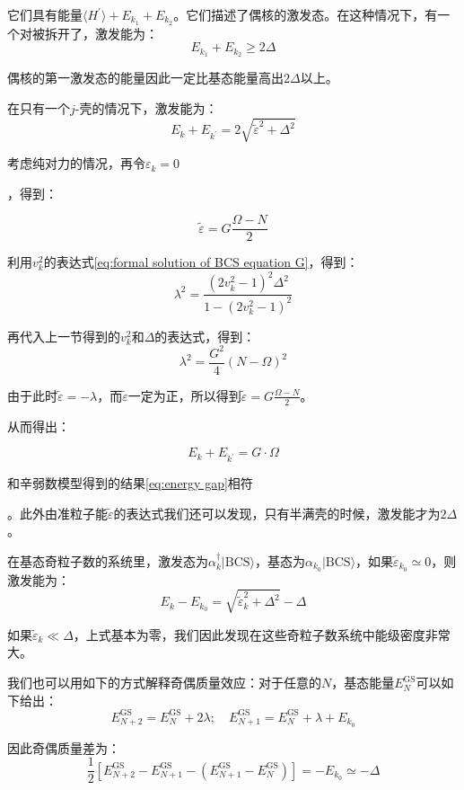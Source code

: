 它们具有能量$\langle H^{\prime}\rangle+E_{k_{1}}+E_{k_{2}}$。它们描述了偶核的激发态。在这种情况下，有一个对被拆开了，激发能为：
\[
E_{k_{1}}+E_{k_{2}}\ge2\Delta
\]

偶核的第一激发态的能量因此一定比基态能量高出$2\Delta$以上。

在只有一个$j$-壳的情况下，激发能为：
\[
E_{k}+E_{k^{\prime}}=2\sqrt{\tilde{\varepsilon}^{2}+\Delta^{2}}
\]

考虑纯对力的情况，再令$\varepsilon_{k}=0$

，得到：

\[
\tilde{\varepsilon}=G\frac{\Omega-N}{2}
\]

\begin{booknote*}
利用$v^{2}_{k}$的表达式\ref{eq:formal solution of BCS equation G}，得到：
\[
\lambda^{2}=\frac{(2v^{2}_{k}-1)^{2}\Delta^{2}}{1-(2v^{2}_{k}-1)^{2}}
\]

再代入上一节得到的$v^{2}_{k}$和$\Delta$的表达式，得到：
\[
\lambda^{2}=\frac{G^{2}}{4}(N-\Omega)^{2}
\]

由于此时$\tilde{\varepsilon}=-\lambda$，而$\tilde{\varepsilon}$一定为正，所以得到$\tilde{\varepsilon}=G\frac{\Omega-N}{2}$。
\end{booknote*}
从而得出：

\[
E_{k}+E_{k^{\prime}}=G\cdot\Omega
\]

和辛弱数模型得到的结果\ref{eq:energy gap}相符

。此外由准粒子能$\tilde{\varepsilon}$的表达式我们还可以发现，只有半满壳的时候，激发能才为$2\Delta$。

在基态奇粒子数的系统里，激发态为$\alpha^{\dagger}_{k}|\text{BCS}\rangle$，基态为$\alpha_{k_{0}}|\text{BCS}\rangle$，如果$\tilde{\varepsilon}_{k_{0}}\simeq0$，则激发能为：
\[
E_{k}-E_{k_{0}}=\sqrt{\tilde{\varepsilon}^{2}_{k}+\Delta^{2}}-\Delta
\]

如果$\tilde{\varepsilon}_{k}\ll\Delta$，上式基本为零，我们因此发现在这些奇粒子数系统中能级密度非常大。

我们也可以用如下的方式解释奇偶质量效应：对于任意的$N$，基态能量$E^{\text{GS}}_{N}$可以如下给出：
\[
E^{\text{GS}}_{N+2}=E^{\text{GS}}_{N}+2\lambda;\quad E^{\text{GS}}_{N+1}=E^{\text{GS}}_{N}+\lambda+E_{k_{0}}
\]

因此奇偶质量差为：
\[
\frac{1}{2}[E^{\text{GS}}_{N+2}-E^{\text{GS}}_{N+1}-(E^{\text{GS}}_{N+1}-E^{\text{GS}}_{N})]=-E_{k_{0}}\simeq-\Delta
\]

